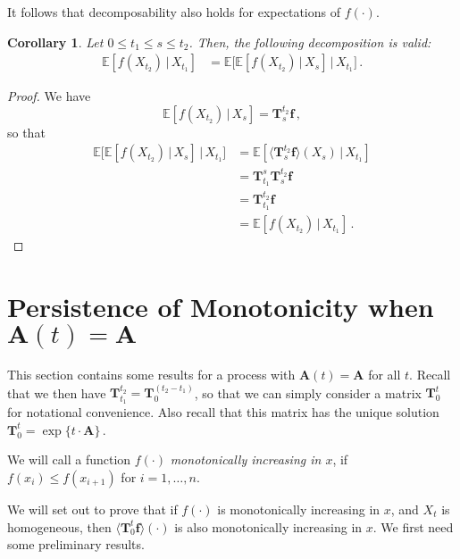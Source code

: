 \documentclass[10pt]{article}
\newtheorem{corollary}[theorem]{Corollary}
\begin{document}
It follows that decomposability also holds for expectations of $f(\cdot)$.

\begin{corollary}
Let $0\leq t_1\leq s\leq t_2$. Then, the following decomposition is valid:
\begin{align*}
\mathbb{E}[f(X_{t_2})\,\vert\,X_{t_1}] &= \mathbb{E}\bigl[\mathbb{E}[f(X_{t_2})\,\vert\,X_{s}]\,\big\vert\,X_{t_1}\bigr]\,.
\end{align*}
\end{corollary}
\begin{proof}
We have
\begin{equation*}
\mathbb{E}[f(X_{t_2})\,\vert\,X_{s}] = \mathbf{T}_{s}^{t_2}\mathbf{f}\,,
\end{equation*}
so that
\begin{align*}
\mathbb{E}\bigl[\mathbb{E}[f(X_{t_2})\,\vert\,X_{s}]\,\big\vert\,X_{t_1}\bigr] &= \mathbb{E}[\langle\mathbf{T}_{s}^{t_2}\mathbf{f}\rangle(X_{s})\,\vert\,X_{t_1}] \\
&= \mathbf{T}_{t_1}^{s}\mathbf{T}_{s}^{t_2}\mathbf{f} \\
&= \mathbf{T}_{t_1}^{t_2}\mathbf{f} \\
&= \mathbb{E}[f(X_{t_2})\,\vert\,X_{t_1}]\,.
\end{align*}
\end{proof}

\section{Persistence of Monotonicity when $\mathbf{A}(t)=\mathbf{A}$}

This section contains some results for a process with $\mathbf{A}(t)=\mathbf{A}$ for all $t$. Recall that we then have $\mathbf{T}_{t_1}^{t_2}=\mathbf{T}_0^{(t_2-t_1)}$, so that we can simply consider a matrix $\mathbf{T}_0^t$ for notational convenience. Also recall that this matrix has the unique solution $\mathbf{T}_0^t=\exp\{t\cdot\mathbf{A}\}$\,.

We will call a function $f(\cdot)$ \emph{monotonically increasing in $x$}, if $f(x_i)\leq f(x_{i+1})$ for $i=1,\ldots,n$.

We will set out to prove that if $f(\cdot)$ is monotonically increasing in $x$, and $X_t$ is homogeneous, then $\langle \mathbf{T}_0^t\mathbf{f}\rangle(\cdot)$ is also monotonically increasing in $x$. We first need some preliminary results.
\end{document}

